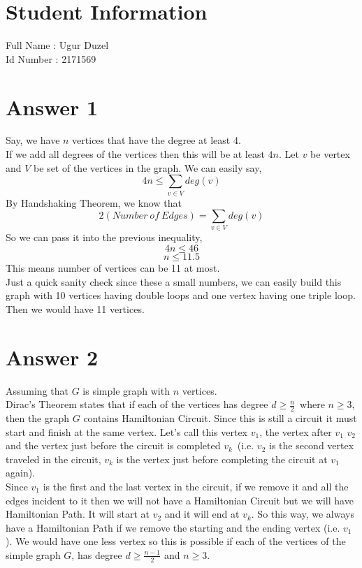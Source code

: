 \documentclass[11pt]{article}
\begin{document}
	
\section*{Student Information } 
Full Name :  Ugur Duzel \\
Id Number :  2171569 \\

\section*{Answer 1}
Say, we have $n$ vertices that have the degree at least 4. \\
If we add all degrees of the vertices then this will be at least $4n$. Let $v$ be vertex and $V$ be set of the vertices in the graph. We can easily say, \\
$$4n \leq \sum_{v \in V}deg(v)$$
By Handshaking Theorem, we know that \\
$$2(Number\ of\ Edges)=\sum_{v \in V}deg(v)$$
So we can pass it into the previous inequality, \\
$$4n \leq 46$$
$$n \leq 11.5$$
This means number of vertices can be 11 at most. \\
Just a quick sanity check since these a small numbers, we can easily build this graph with 10 vertices having double loops and one vertex having one triple loop. Then we would have 11 vertices. \\

\section*{Answer 2}
Assuming that $G$ is simple graph with $n$ vertices. \\
Dirac's Theorem states that if each of the vertices has degree $d \geq \frac{n}{2}$\ where $n \geq 3$, then the graph $G$ contains Hamiltonian Circuit. Since this is still a circuit it must start and finish at the same vertex. Let's call this vertex $v_1$, the vertex after $v_1$ $v_2$ and the vertex just before the circuit is completed $v_k $\ (i.e. $v_2$ is the second vertex traveled in the circuit, $v_k$ is the vertex just before completing the circuit at $ v_1$ again). \\
Since $v_1$ is the first and the last vertex in the circuit, if we remove it and all the edges incident to it then we will not have a Hamiltonian Circuit but we will have Hamiltonian Path. It will start at $v_2$ and it will end at $v_k$. So this way, we always have a Hamiltonian Path if we remove the starting and the ending vertex (i.e. $v_1$). We would have one less vertex so this is possible if each of the vertices of the simple graph $G$, has degree $d \geq \frac{n-1}{2}$ and $n \geq 3$.
\vspace{2cm}
\end{document}
